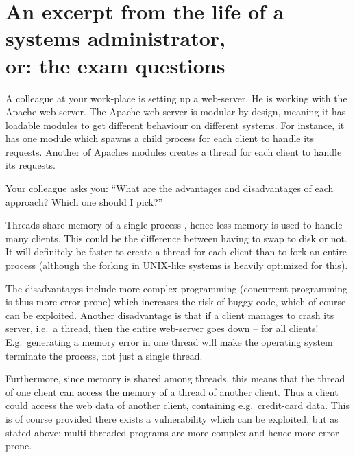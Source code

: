 \documentclass[addpoints]{miunexam}
\begin{document}
\clearpage
\section*{An excerpt from the life of a systems administrator,\\
  or: the exam questions}
\noindent

\begin{questions}
  \question[4]\label{q:apache}
  A colleague at your work-place is setting up a web-server.
  He is working with the Apache web-server.
  The Apache web-server is modular by design, meaning it has loadable modules 
  to get different behaviour on different systems.
  For instance, it has one module which spawns a child process for each client 
  to handle its requests.
  Another of Apaches modules creates a thread for each client to handle its 
  requests.

  Your colleague asks you: ``What are the advantages and disadvantages of each 
  approach?  Which one should I pick?''

  \begin{solution}
    Threads share memory of a single process \cite[p.  
    153--154]{Silberschatz2009osc}, hence less memory is used to handle many 
    clients.
    This could be the difference between having to swap to disk or not.
    It will definitely be faster to create a thread for each client than to 
    fork an entire process \cite[p. 154]{Silberschatz2009osc} (although the 
    forking in UNIX-like systems is heavily optimized for this).

    The disadvantages include more complex programming (concurrent programming 
    is thus more error prone) which increases the risk of buggy code, which of 
    course can be exploited.
    Another disadvantage is that if a client manages to crash its server, i.e.\ 
    a thread, then the entire web-server goes down -- for all clients!
    E.g.\ generating a memory error in one thread will make the operating 
    system terminate the process, not just a single thread.

    Furthermore, since memory is shared among threads, this means that the 
    thread of one client can access the memory of a thread of another client.
    Thus a client could access the web data of another client, containing e.g.\ 
    credit-card data.
    This is of course provided there exists a vulnerability which can be 
    exploited, but as stated above: multi-threaded programs are more complex 
    and hence more error prone.
  \end{solution}


\end{questions}
\end{document}
